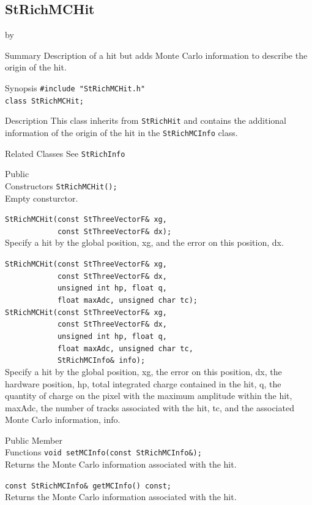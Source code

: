 \documentclass[twoside]{article}
\newcommand{\entrylabel}[1]{\mbox{\textbf{{#1}}}\hfil}%
\newenvironment{entry}
{\begin{list}{}%
    {\renewcommand{\makelabel}{\entrylabel}%
     \setlength{\labelwidth}{90pt}%
     \setlength{\leftmargin}{\labelwidth}
     \advance\leftmargin by \labelsep%
      }%
    }%
  {\end{list}}
\newcommand{\Entrylabel}[1]%
{\raisebox{0pt}[1ex][0pt]{\makebox[\labelwidth][l]%
    {\parbox[t]{\labelwidth}{\hspace{0pt}\textbf{{#1}}}}}}
\newenvironment{Entry}%
{\renewcommand{\entrylabel}{\Entrylabel}\begin{entry}}%
  {\end{entry}}
\begin{document}
\subsection{StRichMCHit}
\label{sec:StRichMCHit}
\begin{Entry}
\item[Summary] Description of a hit but adds Monte Carlo
    information to describe the origin of the hit.
\item[Synopsis]
    \verb+#include "StRichMCHit.h"+\\
    \verb+class StRichMCHit;+\\
\item[Description] This class inherits from \texttt{StRichHit}
    and contains the additional information of the
    origin of the hit in the \texttt{StRichMCInfo} class.
\item[Related Classes]
    See \texttt{StRichInfo}
\item[Public\\ Constructors]
    \verb+StRichMCHit();+\\
    Empty consturctor.
    
    \verb+StRichMCHit(const StThreeVectorF& xg,+\\
    \verb+            const StThreeVectorF& dx);+\\
    Specify a hit by the global position, xg, and the error on this
    position, dx.

    \verb+StRichMCHit(const StThreeVectorF& xg,+\\
    \verb+            const StThreeVectorF& dx,+\\
    \verb+            unsigned int hp, float q,+\\
    \verb+            float maxAdc, unsigned char tc);+\\

    \verb+StRichMCHit(const StThreeVectorF& xg,+\\
    \verb+            const StThreeVectorF& dx,+\\
    \verb+            unsigned int hp, float q,+\\
    \verb+            float maxAdc, unsigned char tc,+\\
    \verb+            StRichMCInfo& info);+\\
    Specify a hit by the global position, xg, the error on this
    position, dx, the hardware position, hp, total integrated charge
    contained in the hit, q, the quantity of charge on the pixel with
    the maximum amplitude within the hit, maxAdc, the number of
    tracks associated with the hit, tc, and the associated Monte Carlo
    information, info.
\item[Public Member\\ Functions]
    \verb+void setMCInfo(const StRichMCInfo&);+\\
    Returns the Monte Carlo information associated with the hit.

    \verb+const StRichMCInfo& getMCInfo() const;+\\
    Returns the Monte Carlo information associated with the hit.
\end{Entry}
\clearpage
\end{document}
